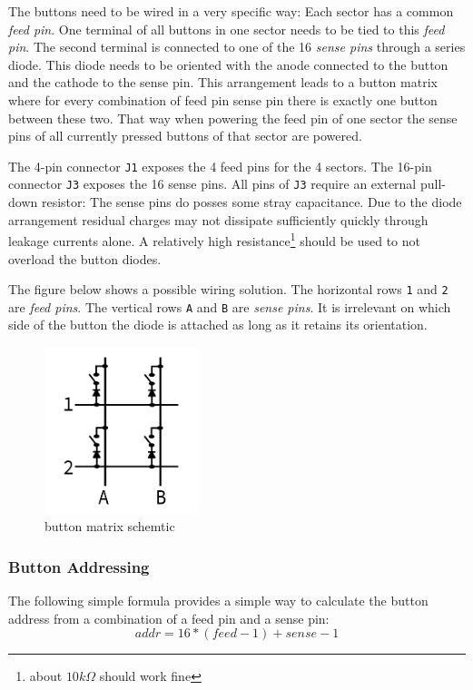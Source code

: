 \documentclass{scrreprt}
\begin{document}
The buttons need to be wired in a very specific way:
Each sector has a common \emph{feed pin}.
One terminal of all buttons in one sector needs to be tied to this \emph{feed pin}.
The second terminal is connected to one of the 16 \emph{sense pins} through a series diode.
This diode needs to be oriented with the anode connected to the button and the cathode to the sense pin.
This arrangement leads to a button matrix where for every combination of feed pin sense pin there is exactly one button between these two.
That way when powering the feed pin of one sector the sense pins of all currently pressed buttons of that sector are powered.

The 4-pin connector \texttt{J1} exposes the 4 feed pins for the 4 sectors.
The 16-pin connector \texttt{J3} exposes the 16 sense pins.
All pins of \texttt{J3} require an external pull-down resistor:
The sense pins do posses some stray capacitance.
Due to the diode arrangement residual charges may not dissipate sufficiently quickly through leakage currents alone.
A relatively high resistance\footnote{about $10k\Omega$ should work fine} should be used to not overload the button diodes.

The figure below shows a possible wiring solution.
The horizontal rows \texttt{1} and \texttt{2} are \emph{feed pins}.
The vertical rows \texttt{A} and \texttt{B} are \emph{sense pins}.
It is irrelevant on which side of the button the diode is attached as long as it retains its orientation.

\begin{figure}[h!]
    \centering
    \includegraphics[width=0.4\textwidth]{button-matrix}
    \caption{button matrix schemtic}
    \label{fig:ctrb}
\end{figure}

\subsubsection{Button Addressing}
The following simple formula provides a simple way to calculate the button address from a combination of a feed pin and a sense pin:
\[addr = 16 * (feed - 1) + sense - 1\]
\end{document}
